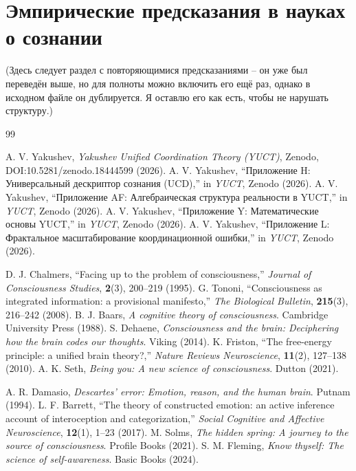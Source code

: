 \documentclass[12pt,a4paper]{article}
\begin{document}
	\section{Эмпирические предсказания в науках о сознании}
	
	(Здесь следует раздел с повторяющимися предсказаниями – он уже был переведён выше, но для полноты можно включить его ещё раз, однако в исходном файле он дублируется. Я оставлю его как есть, чтобы не нарушать структуру.)
	
	\begin{thebibliography}{99}
		
		 A. V. Yakushev, \emph{Yakushev Unified Coordination Theory (YUCT)}, Zenodo, DOI:10.5281/zenodo.18444599 (2026).
		 A. V. Yakushev, ``Приложение H: Универсальный дескриптор сознания (UCD),'' in \emph{YUCT}, Zenodo (2026).
		 A. V. Yakushev, ``Приложение AF: Алгебраическая структура реальности в YUCT,'' in \emph{YUCT}, Zenodo (2026).
		 A. V. Yakushev, ``Приложение Y: Математические основы YUCT,'' in \emph{YUCT}, Zenodo (2026).
		 A. V. Yakushev, ``Приложение L: Фрактальное масштабирование координационной ошибки,'' in \emph{YUCT}, Zenodo (2026).
		
		 D. J. Chalmers, ``Facing up to the problem of consciousness,'' \emph{Journal of Consciousness Studies}, \textbf{2}(3), 200--219 (1995).
		 G. Tononi, ``Consciousness as integrated information: a provisional manifesto,'' \emph{The Biological Bulletin}, \textbf{215}(3), 216--242 (2008).
		 B. J. Baars, \emph{A cognitive theory of consciousness}. Cambridge University Press (1988).
		 S. Dehaene, \emph{Consciousness and the brain: Deciphering how the brain codes our thoughts}. Viking (2014).
		 K. Friston, ``The free-energy principle: a unified brain theory?,'' \emph{Nature Reviews Neuroscience}, \textbf{11}(2), 127--138 (2010).
		 A. K. Seth, \emph{Being you: A new science of consciousness}. Dutton (2021).
		
		 A. R. Damasio, \emph{Descartes' error: Emotion, reason, and the human brain}. Putnam (1994).
		 L. F. Barrett, ``The theory of constructed emotion: an active inference account of interoception and categorization,'' \emph{Social Cognitive and Affective Neuroscience}, \textbf{12}(1), 1--23 (2017).
		 M. Solms, \emph{The hidden spring: A journey to the source of consciousness}. Profile Books (2021).
		 S. M. Fleming, \emph{Know thyself: The science of self-awareness}. Basic Books (2024).
		

\end{thebibliography}
\end{document}
